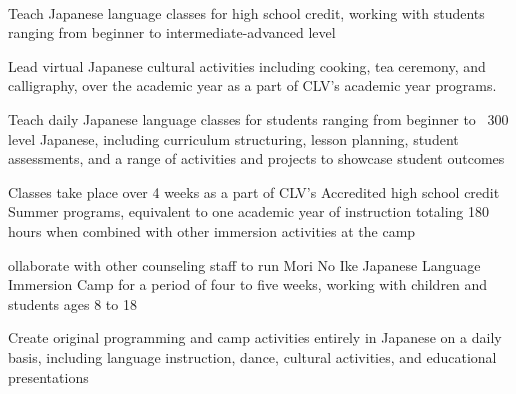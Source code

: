 \documentclass[letterpaper]{deedy-resume_sm} %
\begin{document}
\sectionspace %
\\
\vspace{\topsep} %
\begin{tightitemize}
\item Teach Japanese language classes for high school credit, working with students ranging from beginner to intermediate-advanced level
\item Lead virtual Japanese cultural activities including cooking, tea ceremony, and calligraphy, over the academic year as a part of CLV's academic year programs.
\end{tightitemize}
\vspace{\topsep} %
\begin{tightitemize}
\item Teach daily Japanese language classes for students ranging from beginner to ~300 level Japanese, including curriculum structuring, lesson planning, student assessments, and a range of activities and projects to showcase student outcomes
\item Classes take place over 4 weeks as a part of CLV's Accredited high school credit Summer programs, equivalent to one academic year of instruction totaling 180 hours when combined with other immersion activities at the camp
\end{tightitemize}
\vspace{\topsep} %
\begin{tightitemize}
\item ollaborate with other counseling staff to run Mori No Ike Japanese Language Immersion Camp for a period of four to five weeks, working with children and students ages 8 to 18
\item Create original programming and camp activities entirely in Japanese on a daily basis, including language instruction, dance, cultural activities, and educational presentations
\end{tightitemize}
\end{document}
